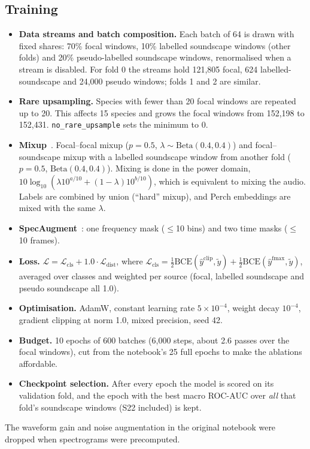 \documentclass[11pt]{article}
\newcommand{\var}[1]{\texttt{#1}}
\begin{document}
\subsection{Training}
\begin{itemize}
  \item \textbf{Data streams and batch composition.} Each batch of 64 is drawn
        with fixed shares: 70\% focal windows, 10\% labelled soundscape
        windows (other folds) and 20\% pseudo-labelled soundscape windows,
        renormalised when a stream is disabled. For fold 0 the streams hold
        121{,}805 focal, 624 labelled-soundscape and 24{,}000 pseudo windows;
        folds 1 and 2 are similar.
  \item \textbf{Rare upsampling.} Species with fewer than 20 focal windows are
        repeated up to 20. This affects 15 species and grows the focal
        windows from 152{,}198 to 152{,}431. \var{no\_rare\_upsample} sets
        the minimum to 0.
  \item \textbf{Mixup}~\cite{zhang2018}. Focal--focal mixup ($p=0.5$, $\lambda\sim
        \mathrm{Beta}(0.4,0.4)$) and focal--soundscape mixup with a labelled
        soundscape window from another fold ($p=0.5$,
        $\mathrm{Beta}(0.4,0.4)$). Mixing is done in the power domain,
        $10\log_{10}(\lambda10^{a/10}+(1-\lambda)10^{b/10})$, which is
        equivalent to mixing the audio. Labels are combined by union
        (``hard'' mixup), and Perch embeddings are mixed with the same
        $\lambda$.
  \item \textbf{SpecAugment}~\cite{park2019}: one frequency mask ($\le$10
        bins) and two time masks ($\le$10 frames).
  \item \textbf{Loss.} $\mathcal L=\mathcal L_{\text{cls}}+1.0\cdot\mathcal
        L_{\text{dist}}$, where $\mathcal L_{\text{cls}}=\tfrac12\mathrm{BCE}(\hat
        y^{\text{clip}},\tilde y)+\tfrac12\mathrm{BCE}(\hat y^{\text{fmax}},\tilde y)$,
        averaged over classes and weighted per source (focal, labelled
        soundscape and pseudo soundscape all 1.0).
  \item \textbf{Optimisation.} AdamW, constant learning rate $5\times10^{-4}$,
        weight decay $10^{-4}$, gradient clipping at norm 1.0, mixed
        precision, seed 42.
  \item \textbf{Budget.} 10 epochs of 600 batches (6{,}000 steps, about 2.6
        passes over the focal windows), cut from the notebook's 25 full epochs
        to make the ablations affordable.
  \item \textbf{Checkpoint selection.} After every epoch the model is scored
        on its validation fold, and the epoch with the best macro ROC-AUC over
        \emph{all} that fold's soundscape windows (S22 included) is kept.
\end{itemize}
The waveform gain and noise augmentation in the original notebook were
dropped when spectrograms were precomputed.
\end{document}

